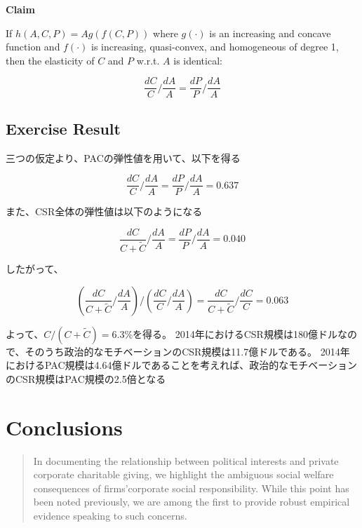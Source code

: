 \documentclass[../root]{subfiles}
\begin{document}
    \textbf{Claim}

    If \(h(A, C, P) = Ag(f(C, P))\) where \(g(\cdot)\) is an increasing and concave function and \(f(\cdot)\) is increasing, quasi-convex, and homogeneous of degree 1, then the elasticity of \(C\) and \(P\) w.r.t. \(A\) is identical:

    \begin{equation}
    \frac{dC}{C}/\frac{dA}{A} = \frac{dP}{P}/\frac{dA}{A}
    \end{equation}

    \subsection{Exercise Result}\label{exercise-result}

    三つの仮定より、PACの弾性値を用いて、以下を得る

    \begin{equation}
    \frac{dC}{C}/\frac{dA}{A} = \frac{dP}{P}/\frac{dA}{A} = 0.637
    \end{equation}

    また、CSR全体の弾性値は以下のようになる

    \begin{equation}
    \frac{dC}{C + \tilde{C}}/\frac{dA}{A} = \frac{dP}{P}/\frac{dA}{A} = 0.040
    \end{equation}

    したがって、

    \begin{equation} 
    (\frac{dC}{C + \tilde{C}}/\frac{dA}{A})/(\frac{dC}{C}/\frac{dA}{A}) = \frac{dC}{C + \tilde{C}}/\frac{dC}{C} = 0.063
    \end{equation}

    よって、\(C/(C + \tilde{C}) = 6.3\%\)を得る。
    2014年におけるCSR規模は180億ドルなので、そのうち政治的なモチベーションのCSR規模は11.7億ドルである。
    2014年におけるPAC規模は4.64億ドルであることを考えれば、政治的なモチベーションのCSR規模はPAC規模の2.5倍となる

    \section{Conclusions}\label{conclusions}

    \begin{quote}
    In documenting the relationship between political interests and private corporate charitable giving, we highlight the ambiguous social welfare consequences of firms'corporate social responsibility. While this point has been noted previously, we are among the first to provide robust empirical evidence speaking to such concerns.
    \end{quote}

    \biblio
\end{document}
